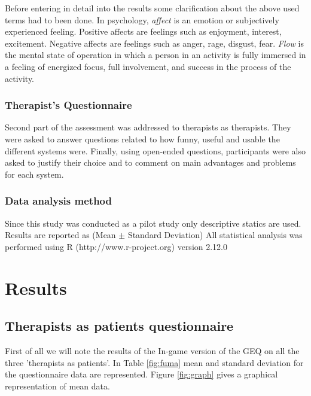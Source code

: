 \documentclass[preprint,authoryear,12pt]{elsarticle}
\begin{document}
\par\medskip

Before entering in detail into the results some clarification about the above used terms had to been done.
In psychology, \emph{affect} is an emotion or subjectively experienced feeling. 
Positive affects are feelings such as enjoyment, interest, excitement. Negative affects are feelings such as anger, rage, disgust, fear.
 \emph{Flow} \citep{csik} is the mental state of operation in which a person in an activity is fully immersed in a feeling of energized focus, full involvement, and success in the process of the activity.

\par \medskip

\subsubsection{Therapist's Questionnaire}
Second part of the assessment was addressed to therapists as therapists. They were asked to answer questions related to how funny, useful and usable the different systems were. Finally, using open-ended questions, participants were also asked
to justify their choice and to comment on main advantages and problems for each system. 

\subsubsection{Data analysis method}
\label{dataanalysis}
Since this study was conducted as a pilot study only descriptive statics are used. Results are reported as (Mean $\pm$ Standard Deviation) All statistical analysis was performed using R (http://www.r-project.org) version 2.12.0


\section{Results}
\label{results}
\subsection{Therapists as patients questionnaire}
\label{resultspatient}
First of all we will note the results of the In-game version of the GEQ on all the three 'therapists as patients'. In Table \ref{fig:fuma} mean and standard deviation for the questionnaire data are represented. Figure 	\ref{fig:graph} gives a graphical representation of mean data.
\end{document}
